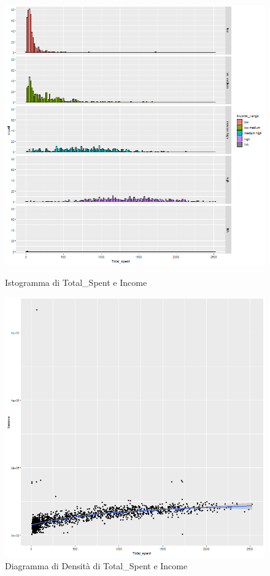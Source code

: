 \documentclass[letterpaper,11pt]{article}
\begin{document}
\begin{figure}[h]
  \centering
  \begin{minipage}[b]{0.4\textwidth}
    \includegraphics[width=\textwidth]{Img/EDA/EDA034.png}
    \caption{Istogramma di Total\_Spent e Income}
     \label{fig:IstogrammaTsIncome}
  \end{minipage}
  \hfill
  \begin{minipage}[b]{0.4\textwidth}
    \includegraphics[width=\textwidth]{Img/EDA/EDA035.png}
    \caption{Diagramma di Densità di Total\_Spent e Income}
     \label{fig:DensitaTsIncome}
  \end{minipage}
\end{figure}
\end{document}
